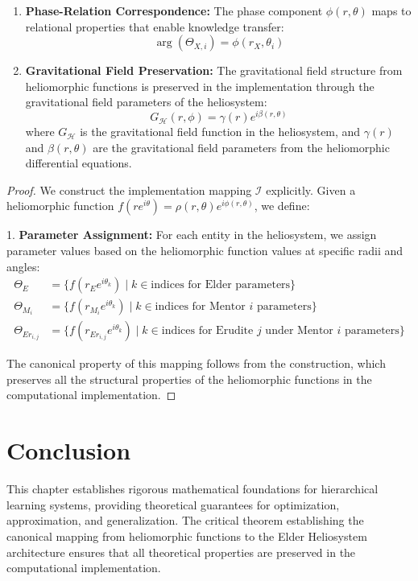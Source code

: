 \begin{theorem}
\begin{enumerate}
    \item \textbf{Phase-Relation Correspondence:} The phase component $\phi(r,\theta)$ maps to relational properties that enable knowledge transfer:
    \begin{equation}
        \arg(\Theta_{X,i}) = \phi(r_X, \theta_i)
    \end{equation}
    
    \item \textbf{Gravitational Field Preservation:} The gravitational field structure from heliomorphic functions is preserved in the implementation through the gravitational field parameters of the heliosystem:
    \begin{equation}
        G_{\mathcal{H}}(r, \phi) = \gamma(r)e^{i\beta(r,\theta)}
    \end{equation}
    where $G_{\mathcal{H}}$ is the gravitational field function in the heliosystem, and $\gamma(r)$ and $\beta(r,\theta)$ are the gravitational field parameters from the heliomorphic differential equations.
\end{enumerate}
\end{theorem}

\begin{proof}
We construct the implementation mapping $\mathcal{I}$ explicitly. Given a heliomorphic function $f(re^{i\theta}) = \rho(r,\theta)e^{i\phi(r,\theta)}$, we define:

1. \textbf{Parameter Assignment:} For each entity in the heliosystem, we assign parameter values based on the heliomorphic function values at specific radii and angles:
\begin{align}
\Theta_E &= \{f(r_E e^{i\theta_k}) \mid k \in \text{indices for Elder parameters}\} \\
\Theta_{M_i} &= \{f(r_{M_i} e^{i\theta_k}) \mid k \in \text{indices for Mentor $i$ parameters}\} \\
\Theta_{Er_{i,j}} &= \{f(r_{Er_{i,j}} e^{i\theta_k}) \mid k \in \text{indices for Erudite $j$ under Mentor $i$ parameters}\}
\end{align}

The canonical property of this mapping follows from the construction, which preserves all the structural properties of the heliomorphic functions in the computational implementation.
\end{proof}

\section{Conclusion}

This chapter establishes rigorous mathematical foundations for hierarchical learning systems, providing theoretical guarantees for optimization, approximation, and generalization. The critical theorem establishing the canonical mapping from heliomorphic functions to the Elder Heliosystem architecture ensures that all theoretical properties are preserved in the computational implementation.